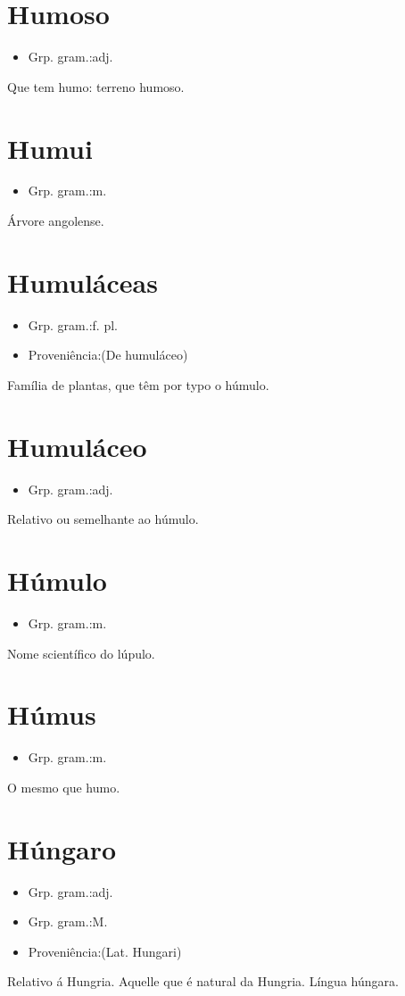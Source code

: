 \documentclass{article}
\begin{document}
\section{Humoso}
\begin{itemize}
\item {Grp. gram.:adj.}
\end{itemize}
Que tem humo: \textunderscore terreno humoso\textunderscore .
\section{Humui}
\begin{itemize}
\item {Grp. gram.:m.}
\end{itemize}
Árvore angolense.
\section{Humuláceas}
\begin{itemize}
\item {Grp. gram.:f. pl.}
\end{itemize}
\begin{itemize}
\item {Proveniência:(De \textunderscore humuláceo\textunderscore )}
\end{itemize}
Família de plantas, que têm por typo o húmulo.
\section{Humuláceo}
\begin{itemize}
\item {Grp. gram.:adj.}
\end{itemize}
Relativo ou semelhante ao húmulo.
\section{Húmulo}
\begin{itemize}
\item {Grp. gram.:m.}
\end{itemize}
Nome scientífico do lúpulo.
\section{Húmus}
\begin{itemize}
\item {Grp. gram.:m.}
\end{itemize}
O mesmo que \textunderscore humo\textunderscore .
\section{Húngaro}
\begin{itemize}
\item {Grp. gram.:adj.}
\end{itemize}
\begin{itemize}
\item {Grp. gram.:M.}
\end{itemize}
\begin{itemize}
\item {Proveniência:(Lat. \textunderscore Hungari\textunderscore )}
\end{itemize}
Relativo á Hungria.
Aquelle que é natural da Hungria.
Língua húngara.
\end{document}
